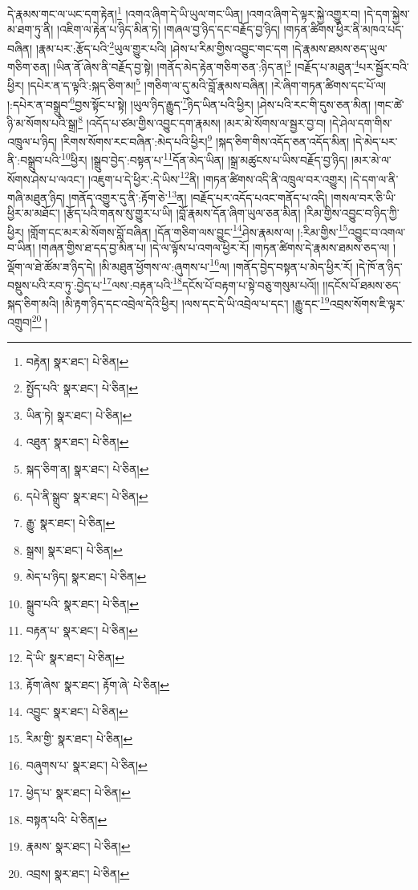 དེ་རྣམས་གང་ལ་ཡང་དག་རྟེན།\footnote{བརྟེན།  སྣར་ཐང་།  པེ་ཅིན། } །འགའ་ཞིག་དེ་ཡི་ཡུལ་གང་ཡིན། །འགའ་ཞིག་དེ་ལྟར་སྐྱེ་འགྱུར་བ། །དེ་དག་སྐྱེས་མ་ཐག་ཏུ་ནི། །འཇིག་ལ་རྟེན་པ་ཉིད་མིན་ཏེ། །གཞལ་བྱ་ཉིད་དང་བརྗོད་བྱ་ཉིད། །གཏན་ཚིགས་ཕྱིར་ནི་མཁའ་པད་བཞིན། །རྣམ་པར་:རྩོད་པའི་\footnote{སྤྱོད་པའི་  སྣར་ཐང་།  པེ་ཅིན། }ཡུལ་གྱུར་པའི། །ཤེས་པ་རིམ་གྱིས་འབྱུང་གང་དག །དེ་རྣམས་ཐམས་ཅད་ཡུལ་གཅིག་ཅན། །ཡིན་ནོ་ཞེས་ནི་བརྗོད་བྱ་སྟེ། །གནོད་མེད་རྟེན་གཅིག་ཅན་:ཉིད་ན།\footnote{ཡིན་ཏེ།  སྣར་ཐང་།  པེ་ཅིན། } །བརྗོད་པ་མཐུན་\footnote{འཐུན་  སྣར་ཐང་།  པེ་ཅིན། }པར་སྦྱོར་བའི་ཕྱིར། །དཔེར་ན་ད་ལྟའི་:སྐད་ཅིག་མ།\footnote{སྐད་ཅིག་ན།  སྣར་ཐང་།  པེ་ཅིན། } །གཅིག་ལ་དུ་མའི་བློ་རྣམས་བཞིན། །རེ་ཞིག་གཏན་ཚིགས་དང་པོ་ལ། །:དཔེར་ན་བསྒྲུབ་\footnote{དཔེ་ནི་སྒྲུབ་  སྣར་ཐང་།  པེ་ཅིན། }བྱས་སྟོང་པ་སྟེ། །ཡུལ་ཉིད་རྒྱུད་\footnote{རྒྱུ་  སྣར་ཐང་།  པེ་ཅིན། }ཉིད་ཡིན་པའི་ཕྱིར། །ཤེས་པའི་རང་གི་དུས་ཅན་མིན། །གང་ཚེ་ཉི་མ་སོགས་པའི་སྒྲ།\footnote{སྒྲས།  སྣར་ཐང་།  པེ་ཅིན། } །འདོད་པ་ཙམ་གྱིས་འབྱུང་དག་རྣམས། །མར་མེ་སོགས་ལ་སྦྱར་བྱ་བ། །དེ་ཤེལ་དག་གིས་འཁྲུལ་པ་ཉིད། །རིགས་སོགས་རང་བཞིན་:མེད་པའི་ཕྱིར།\footnote{མེད་པ་ཉིད།  སྣར་ཐང་།  པེ་ཅིན། } །སྐད་ཅིག་གིས་འདོད་ཅན་འདོད་མིན། །དེ་མེད་པར་ནི་:བསྒྲུབ་པའི་\footnote{སྒྲུབ་པའི་  སྣར་ཐང་།  པེ་ཅིན། }ཕྱིར། །སྒྲུབ་བྱེད་:བསྟན་པ་\footnote{བརྟན་པ་  སྣར་ཐང་།  པེ་ཅིན། }དོན་མེད་ཡིན། །སྒྲ་མཚུངས་པ་ཡིས་བརྗོད་བྱ་ཉིད། །མར་མེ་ལ་སོགས་ཤེས་པ་ལའང་། །འཇུག་པ་དེ་ཕྱིར་:དེ་ཡིས་\footnote{དེ་ཡི་  སྣར་ཐང་།  པེ་ཅིན། }ནི། །གཏན་ཚིགས་འདི་ནི་འཁྲུལ་བར་འགྱུར། །དེ་དག་ལ་ནི་གཞི་མཐུན་ཉིད། །གནོད་འགྱུར་དུ་ནི་:རྟོག་ཅེ་\footnote{རྟོག་ཞེས་  སྣར་ཐང་། རྟོག་ཞེ་  པེ་ཅིན། }ན། །བརྗོད་པར་འདོད་པའང་གནོད་པ་འདི། །གསལ་བར་ཅི་ཡི་ཕྱིར་མ་མཐོང་། །རྩོད་པའི་གནས་སུ་གྱུར་པ་ཡི། །བློ་རྣམས་དོན་ཞིག་ཡུལ་ཅན་མིན། །རིམ་གྱིས་འབྱུང་བ་ཉིད་ཀྱི་ཕྱིར། །གློག་དང་མར་མེ་སོགས་བློ་བཞིན། །དོན་གཅིག་ལས་བྱུང་\footnote{འབྱུང་  སྣར་ཐང་།  པེ་ཅིན། }ཤེས་རྣམས་ལ། །:རིམ་གྱིས་\footnote{རིམ་གྱི་  སྣར་ཐང་།  པེ་ཅིན། }འབྱུང་བ་འགལ་བ་ཡིན། །གཞན་གྱིས་ཐ་དད་བྱ་མིན་པ། །དེ་ལ་ལྟོས་པ་འགལ་ཕྱིར་རོ། །གཏན་ཚིགས་དེ་རྣམས་ཐམས་ཅད་ལ། །ལྡོག་ལ་ཐེ་ཚོམ་ཟ་ཉིད་དེ། །མི་མཐུན་ཕྱོགས་ལ་:ཞུགས་པ་\footnote{བཞུགས་པ་  སྣར་ཐང་།  པེ་ཅིན། }ལ། །གནོད་བྱེད་བསྟན་པ་མེད་ཕྱིར་རོ། །དེ་ཁོ་ན་ཉིད་བསྡུས་པའི་རབ་ཏུ་:བྱེད་པ་\footnote{ཕྱེད་པ་  སྣར་ཐང་།  པེ་ཅིན། }ལས་:བརྟན་པའི་\footnote{བསྟན་པའི་  པེ་ཅིན། }དངོས་པོ་བརྟག་པ་སྟེ་བཅུ་གསུམ་པའོ།། །།དངོས་པོ་ཐམས་ཅད་སྐད་ཅིག་མའི། །མི་རྟག་ཉིད་དང་འབྲེལ་དེའི་ཕྱིར། །ལས་དང་དེ་ཡི་འབྲེལ་པ་དང་། །རྒྱུ་དང་\footnote{རྣམས་  སྣར་ཐང་།  པེ་ཅིན། }འབྲས་སོགས་ཇི་ལྟར་འགྲུབ།\footnote{འབྲས།  སྣར་ཐང་།  པེ་ཅིན། } །
